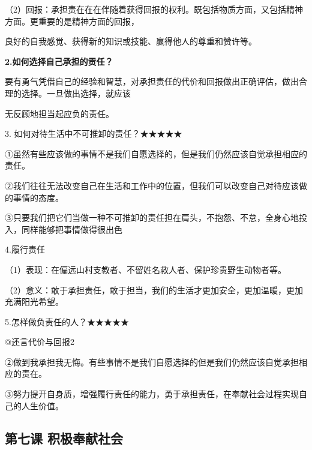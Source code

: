 \documentclass[lang=cn,11pt]{elegantbook}
\newcommand{\daofasym}[1]{{\daofasymbolfont #1}}
\newcommand{\daofasym}[1]{#1}
\begin{document}
（2）回报：承担责在在在伴随着获得回报的权利。既包括物质方面，又包括精神方面。更重要的是精神方面的回报，\par

良好的自我感觉、获得新的知识或技能、赢得他人的尊重和赞许等。\par

\textbf{2.如何选择自己承担的贡任？}\par

要有勇气凭借自己的经验和智慧，对承担责任的代价和回报做出正确评估，做出合理的选择。一旦做出选择，就应该\par

无反顾地担当起应负的责任。\par

3. 如何对待生活中不可推卸的责任？\daofasym{★}\daofasym{★}\daofasym{★}\daofasym{★}\daofasym{★}\par

\daofasym{①}虽然有些应该做的事情不是我们自愿选择的，但是我们仍然应该自觉承担相应的责任。\par

\daofasym{②}我们往往无法改变自己在生活和工作中的位置，但我们可以改变自己对待应该做的事情的态度。\par

\daofasym{③}只要我们把它们当做一种不可推卸的责任担在肩头，不抱怨、不怠，全身心地投入，同样能够把事情做得很出色\par

4.履行责任\par

（1）表现：在偏远山村支教者、不留姓名救人者、保护珍贵野生动物者等。\par

（2）意义：敢于承担责任，敢于担当，我们的生活才更加安全，更加温暖，更加充满阳光希望。\par

5.怎样做负责任的人？\daofasym{★}\daofasym{★}\daofasym{★}\daofasym{★}\daofasym{★}\par

@还言代价与回报2\par

\daofasym{②}做到我承担我无悔。有些事情不是我们自愿选择的但是我们仍然应该自觉承担相应的责在。\par

\daofasym{③}努力提开自身质，增强履行责任的能力，勇于承担责任，在奉献社会过程实现自己的人生价值。\par

\subsection*{第七课 积极奉献社会}
\end{document}
